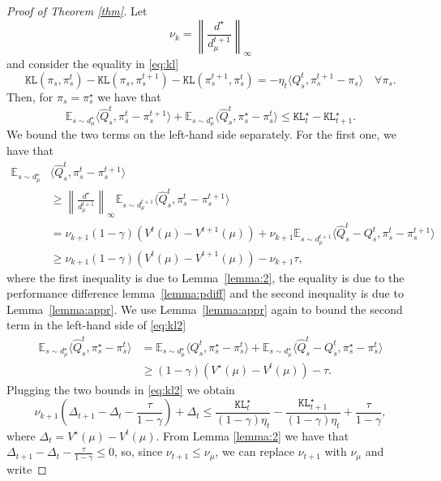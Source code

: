 \documentclass[a4paper,12pt]{article}
\numberwithin{theorem}{section}
\newcommand\E{\mathbb{E}}
\newcommand\1{\mathbf{1}}
\newcommand\KL{\mathtt{KL}}
\newcommand{\norm}[1]{\left\lVert #1 \right\rVert}
\begin{document}
\begin{proof}[Proof of Theorem \ref{thm}]
Let \[ \nu_k = \norm{\frac{d^\star}{d_\mu^{t+1}}}_\infty\]
and consider the equality in \eqref{eq:kl}
\[\KL(\pi_s,\pi^t_s) - \KL(\pi_s,\pi^{t+1}_s) - \KL(\pi^{t+1}_s,\pi^t_s) = -\eta_t\langle Q^t_s,\pi^{t+1}_s - \pi_s\rangle\quad\forall\pi_s.\]
Then, for $\pi_s = \pi^\star_s$ we have that
\begin{equation}
	\label{eq:kl2}
	\E_{s\sim d_\mu^\star}\langle \widehat{Q}^t_s,\pi^t_s - \pi^{t+1}_s\rangle + \E_{s\sim d_\mu^\star}\langle \widehat{Q}^t_s,\pi^\star_s - \pi^t_s\rangle\leq \KL^\star_t - \KL^\star_{t+1}.
\end{equation}
We bound the two terms on the left-hand side separately. For the first one, we have that
\begin{align*}
	\E_{s\sim d_\mu^\star}&\langle \widehat{Q}^t_s,\pi^t_s - \pi^{t+1}_s\rangle\\&\geq \norm{\frac{d^\star}{d_\mu^{t+1}}}_\infty\E_{s\sim d_\mu^{t+1}}\langle \widehat{Q}_s^t,\pi^t_s - \pi^{t+1}_s\rangle\\
	&= \nu_{k+1}(1-\gamma)\left(V^t(\mu)-V^{t+1}(\mu)\right)+ \nu_{k+1}\E_{s\sim d_\mu^{t+1}}\langle \widehat{Q}_s^t-Q_s^t,\pi^t_s - \pi^{t+1}_s\rangle\\
	&\geq  \nu_{k+1}(1-\gamma)\left(V^t(\mu)-V^{t+1}(\mu)\right)- \nu_{k+1}\tau,
\end{align*}
where the first inequality is due to Lemma~\ref{lemma:2}, the equality is due to the performance difference lemma~\eqref{lemma:pdiff} and the second inequality is due to Lemma~\ref{lemma:appr}. We use Lemma~\ref{lemma:appr} again to bound the second term in the left-hand side of \eqref{eq:kl2}
\begin{align*}
	\E_{s\sim d_\mu^\star}\langle \widehat{Q}^t_s,\pi^\star_s - \pi^t_s\rangle &= \E_{s\sim d_\mu^\star}\langle Q^t_s,\pi^\star_s - \pi^t_s\rangle + \E_{s\sim d_\mu^\star}\langle \widehat{Q}^t_s-Q^t_s,\pi^\star_s - \pi^t_s\rangle\\
	&\geq (1-\gamma)\left(V^\star(\mu)-V^t(\mu)\right) - \tau.
\end{align*}
Plugging the two bounds in \eqref{eq:kl2} we obtain
\[ \nu_{k+1}\left(\Delta_{t+1}-\Delta_t-\frac{\tau}{1-\gamma}\right)+\Delta_t\leq\frac{\KL^\star_t}{(1-\gamma)\eta_t} -\frac{\KL^\star_{t+1}}{(1-\gamma)\eta_t}+\frac{\tau}{1-\gamma},\]
where $\Delta_t = V^\star(\mu)-V^t(\mu)$. From Lemma \ref{lemma:2} we have that $\Delta_{t+1}-\Delta_t-\frac{\tau}{1-\gamma}\leq0$, so, since $\nu_{t+1}\leq \nu_\mu$, we can replace $\nu_{t+1}$ with $\nu_\mu$ and write

\end{proof}
\end{document}
